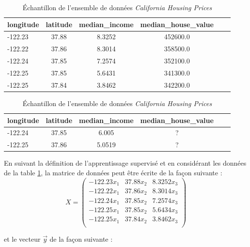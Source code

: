 \documentclass[12pt, french]{report}
\begin{document}
\begin{table}[h]
	\centering
	\begin{tabular}{|l|c|c|c|c|c|}
		\hline
		\textbf{longitude} & \textbf{latitude} & \textbf{median\_income} & \textbf{median\_house\_value}   \\
		\hline
		 	-122.23 & 37.88  & 8.3252	& 452600.0 \\
			-122.22 & 37.86 & 8.3014 & 358500.0 \\
			-122.24 & 37.85 & 7.2574 & 352100.0\\
			-122.25 & 37.85 & 5.6431 & 341300.0\\
			-122.25	& 37.84 & 3.8462 & 342200.0\\
		\hline
		
	\end{tabular}
	\caption{Échantillon de l'ensemble de données \textit{California Housing Prices}}
	\label{tab:CaliforniaHousingPricesTrain}
\end{table}

\begin{table}[h]
	\centering
	\begin{tabular}{|l|c|c|c|c|c|}
		\hline
		\textbf{longitude} & \textbf{latitude} & \textbf{median\_income} & \textbf{median\_house\_value}   \\
		\hline
		-122.24 & 37.85  & 6.005	& ? \\
		-122.25 & 37.86 & 5.0519 & ? \\
		\hline
		
	\end{tabular}
	\caption{Échantillon de l'ensemble de données \textit{California Housing Prices}}
	\label{tab:CaliforniaHousingPricesTest}
\end{table}

En suivant la définition de l'apprentissage supervisé et en considérant les données de la table \ref{tab:CaliforniaHousingPricesTrain}, la matrice de données peut être écrite de la façon suivante :
$$ X=
	\begin{pmatrix}
		-122.23x_1 & 37.88x_2 & 8.3252x_3\\
		-122.22x_1 & 37.86x_2 & 8.3014x_3 \\
		-122.24x_1 & 37.85x_2 & 7.2574x_3 \\
		-122.25x_1 & 37.85x_2 & 5.6434x_3 \\
		-122.25x_1 & 37.84x_2 & 3.8462x_3 \\
	\end{pmatrix}	
$$

et le vecteur $ \vec{y}$ de la façon suivante :
\end{document}

